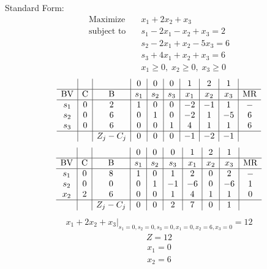 \documentclass{article}
\begin{document}
Standard Form:\\
\begin{align*}
\text{Maximize} \quad & x_{1} + 2x_{2} + x_{3}\\
\text{subject to} \quad
& s_{1} - 2x_{1} - x_{2} + x_{3}=2\\
& s_{2} - 2x_{1} + x_{2} - 5x_{3}=6\\
& s_{3} + 4x_{1} + x_{2} + x_{3}=6\\
& x_{1}\ge0,\; x_{2}\ge0,\; x_{3}\ge0\end{align*}
\begin{align*}
\begin{array}{c|c|c|c|c|c|c|c|c|c}
 &  &  & 0 & 0 & 0 & 1 & 2 & 1 & \\
\hline
\text{BV} & \text{C} & \text{B} & s_{1} & s_{2} & s_{3} & x_{1} & x_{2} & x_{3} & \text{MR} \\
\hline
s_{1} & 0 & 2 & 1 & 0 & 0 & -2 & -1 & 1 & - \\
s_{2} & 0 & 6 & 0 & 1 & 0 & -2 & 1 & -5 & 6 \\
s_{3} & 0 & 6 & 0 & 0 & 1 & 4 & 1 & 1 & 6 \\
\hline
 &  & Z_j-C_j & 0 & 0 & 0 & -1 & -2 & -1 & \\
\end{array}
\end{align*}
\begin{align*}
\begin{array}{c|c|c|c|c|c|c|c|c|c}
 &  &  & 0 & 0 & 0 & 1 & 2 & 1 & \\
\hline
\text{BV} & \text{C} & \text{B} & s_{1} & s_{2} & s_{3} & x_{1} & x_{2} & x_{3} & \text{MR} \\
\hline
s_{1} & 0 & 8 & 1 & 0 & 1 & 2 & 0 & 2 & - \\
s_{2} & 0 & 0 & 0 & 1 & -1 & -6 & 0 & -6 & 1 \\
x_{2} & 2 & 6 & 0 & 0 & 1 & 4 & 1 & 1 & 0 \\
\hline
 &  & Z_j-C_j & 0 & 0 & 2 & 7 & 0 & 1 & \\
\end{array}
\end{align*}
\begin{align*}
\left.x_{1} + 2x_{2} + x_{3}\right|_{s_{1}=0,s_{2}=0,s_{3}=0,x_{1}=0,x_{2}=6,x_{3}=0}=12\end{align*}
\begin{align*}
Z=12\end{align*}
\begin{align*}
x_{1}=0\end{align*}
\begin{align*}
x_{2}=6\end{align*}
\end{document}
